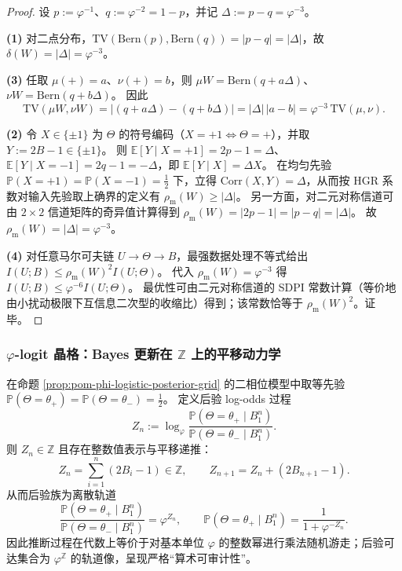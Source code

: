 \begin{proof}
设 \(p:=\varphi^{-1}\)、\(q:=\varphi^{-2}=1-p\)，并记 \(\Delta:=p-q=\varphi^{-3}\)。
\par
\textbf{(1)} 对二点分布，\(\mathrm{TV}(\mathrm{Bern}(p),\mathrm{Bern}(q))=|p-q|=|\Delta|\)，故 \(\delta(W)=|\Delta|=\varphi^{-3}\)。
\par
\textbf{(3)} 任取 \(\mu(+)=a\)、\(\nu(+)=b\)，则
\(
\mu W=\mathrm{Bern}(q+a\Delta)
\)、\(
\nu W=\mathrm{Bern}(q+b\Delta)
\)。
因此
\[
\mathrm{TV}(\mu W,\nu W)=|(q+a\Delta)-(q+b\Delta)|=|\Delta|\,|a-b|=\varphi^{-3}\,\mathrm{TV}(\mu,\nu).
\]
\par
\textbf{(2)} 令 \(X\in\{\pm 1\}\) 为 \(\Theta\) 的符号编码（\(X=+1\iff \Theta=+\)），并取 \(Y:=2B-1\in\{\pm 1\}\)。
则 \(\mathbb{E}[Y\mid X=+1]=2p-1=\Delta\)、\(\mathbb{E}[Y\mid X=-1]=2q-1=-\Delta\)，即
\(\mathbb{E}[Y\mid X]=\Delta X\)。
在均匀先验 \(\mathbb{P}(X=+1)=\mathbb{P}(X=-1)=\tfrac12\) 下，立得
\(\mathrm{Corr}(X,Y)=\Delta\)，从而按 HGR 系数对输入先验取上确界的定义有 \(\rho_{\mathrm{m}}(W)\ge|\Delta|\)。
另一方面，对二元对称信道可由 \(2\times 2\) 信道矩阵的奇异值计算得到 \(\rho_{\mathrm{m}}(W)=|2p-1|=|p-q|=|\Delta|\)。
故 \(\rho_{\mathrm{m}}(W)=|\Delta|=\varphi^{-3}\)。
\par
\textbf{(4)} 对任意马尔可夫链 \(U\to\Theta\to B\)，最强数据处理不等式给出
\(
I(U;B)\le \rho_{\mathrm{m}}(W)^2 I(U;\Theta)
\)。
代入 \(\rho_{\mathrm{m}}(W)=\varphi^{-3}\) 得
\(
I(U;B)\le \varphi^{-6} I(U;\Theta)
\)。
最优性可由二元对称信道的 SDPI 常数计算（等价地由小扰动极限下互信息二次型的收缩比）得到；该常数恰等于 \(\rho_{\mathrm{m}}(W)^2\)。证毕。
\end{proof}

\subsubsection{\texorpdfstring{$\varphi$}{phi}-logit 晶格：Bayes 更新在 \texorpdfstring{$\mathbb{Z}$}{Z} 上的平移动力学}\label{subsubsec:pom-phi-logit-lattice-dynamics}

\begin{corollary}\label{cor:pom-phi-logit-lattice-translation}
在命题 \ref{prop:pom-phi-logistic-posterior-grid} 的二相位模型中取等先验
\(\mathbb{P}(\Theta=\theta_+)=\mathbb{P}(\Theta=\theta_-)=\tfrac12\)。
定义后验 log-odds 过程
\[
Z_n:=\log_{\varphi}\frac{\mathbb{P}(\Theta=\theta_+\mid B_1^n)}{\mathbb{P}(\Theta=\theta_-\mid B_1^n)}.
\]
则 \(Z_n\in\mathbb{Z}\) 且存在整数值表示与平移递推：
\[
\boxed{\;Z_n=\sum_{i=1}^{n}(2B_i-1)\in\mathbb{Z},\qquad
Z_{n+1}=Z_n+(2B_{n+1}-1).\;}
\]
从而后验族为离散轨道
\[
\boxed{\;\frac{\mathbb{P}(\Theta=\theta_+\mid B_1^n)}{\mathbb{P}(\Theta=\theta_-\mid B_1^n)}=\varphi^{Z_n},\qquad
\mathbb{P}(\Theta=\theta_+\mid B_1^n)=\frac{1}{1+\varphi^{-Z_n}}.\;}
\]
因此推断过程在代数上等价于对基本单位 \(\varphi\) 的整数幂进行乘法随机游走；后验可达集合为 \(\varphi^{\mathbb{Z}}\) 的轨道像，呈现严格“算术可审计性”。
\end{corollary}

